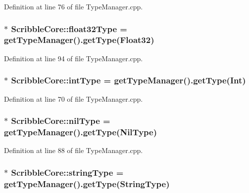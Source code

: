 Definition at line 76 of file Type\-Manager.\-cpp.

\hypertarget{namespace_scribble_core_ad2bb74537033302a0a594608de91dddd}{
\subsubsection[{float32\-Type}]{$\ast$ Scribble\-Core\-::float32\-Type = {\bf get\-Type\-Manager}().get\-Type({\bf Float32})}}\label{namespace_scribble_core_ad2bb74537033302a0a594608de91dddd}


Definition at line 94 of file Type\-Manager.\-cpp.

\hypertarget{namespace_scribble_core_aa4e0a60f3c2ddca35cd411093ee3c17b}{
\subsubsection[{int\-Type}]{$\ast$ Scribble\-Core\-::int\-Type = {\bf get\-Type\-Manager}().get\-Type({\bf Int})}}\label{namespace_scribble_core_aa4e0a60f3c2ddca35cd411093ee3c17b}


Definition at line 70 of file Type\-Manager.\-cpp.

\hypertarget{namespace_scribble_core_a06f545c43aa1a261520f84849b88744e}{
\subsubsection[{nil\-Type}]{$\ast$ Scribble\-Core\-::nil\-Type = {\bf get\-Type\-Manager}().get\-Type({\bf Nil\-Type})}}\label{namespace_scribble_core_a06f545c43aa1a261520f84849b88744e}


Definition at line 88 of file Type\-Manager.\-cpp.

\hypertarget{namespace_scribble_core_ad0d91b107518e6b5fb6f775b73b15131}{
\subsubsection[{string\-Type}]{$\ast$ Scribble\-Core\-::string\-Type = {\bf get\-Type\-Manager}().get\-Type({\bf String\-Type})}}\label{namespace_scribble_core_ad0d91b107518e6b5fb6f775b73b15131}


